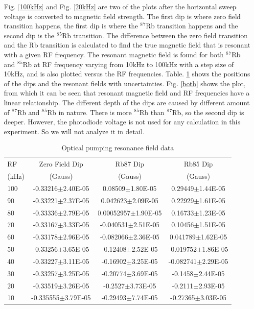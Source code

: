 \documentclass[prb,preprint]{revtex4-1}
\begin{document}
Fig. \ref{100kHz} and Fig. \ref{20kHz} are two of the plots after the horizontal sweep voltage is converted to magnetic field strength. The first dip is where zero field transition happens, the first dip is where the  $^8$$^7$Rb transition happens and the second dip is the $^8$$^5$Rb transition. The difference between the zero field transition and the Rb transition is calculated to find the true magnetic field that is resonant with a given RF frequency. The resonant magnetic field is found for both $^8$$^7$Rb and $^8$$^5$Rb at RF frequency varying from 10kHz to 100kHz with a step size of 10kHz, and is also plotted versus the RF frequencies. Table. \ref{data} shows the positions of the dips and the resonant fields with uncertainties. Fig. \ref{both} shows the plot, from which it can be seen that resonant magnetic field and RF frequencies have a linear relationship. The different depth of the dips are caused by different amount of $^8$$^7$Rb and $^8$$^5$Rb in nature. There is more $^8$$^5$Rb than $^8$$^7$Rb, so the second dip is deeper. However, the photodiode voltage is not used for any calculation in this experiment. So we will not analyze it in detail.

\begin{table}[h]
\centering
\caption{Optical pumping resonance field data}
\begin{ruledtabular}
\begin{tabular}{ l c c c}
RF & Zero Field Dip & Rb87 Dip & Rb85 Dip\\
(kHz) & (Gauss) & (Gauss) & (Gauss)\\
\hline
100	& -0.33216$\pm$2.40E-05 & 0.08509$\pm$1.80E-05 & 0.29449$\pm$1.44E-05\\
90&-0.33221$\pm$2.37E-05&0.042623$\pm$2.09E-05&0.22929$\pm$1.61E-05\\
80&-0.33336$\pm$2.79E-05&0.00052957$\pm$1.90E-05&0.16733$\pm$1.23E-05\\
70&-0.33167$\pm$3.33E-05&-0.040531$\pm$2.51E-05&0.10456$\pm$1.51E-05\\
60&-0.33178$\pm$2.96E-05&-0.082066$\pm$2.36E-05&0.041789$\pm$1.62E-05\\
50&-0.33256$\pm$3.65E-05&-0.12408$\pm$2.52E-05&-0.019752$\pm$1.86E-05\\
40&-0.33227$\pm$3.11E-05&-0.16902$\pm$3.25E-05&-0.082741$\pm$2.29E-05\\
30&-0.33257$\pm$3.25E-05&-0.20774$\pm$3.69E-05&-0.1458$\pm$2.44E-05	\\
20&-0.33519$\pm$3.26E-05&-0.2527$\pm$3.73E-05&-0.2111$\pm$2.93E-05\\
10	&-0.335555$\pm$3.79E-05&-0.29493$\pm$7.74E-05&-0.27365$\pm$3.03E-05\\

\end{tabular}
\end{ruledtabular}
\label{data}
\end{table}
\end{document}
